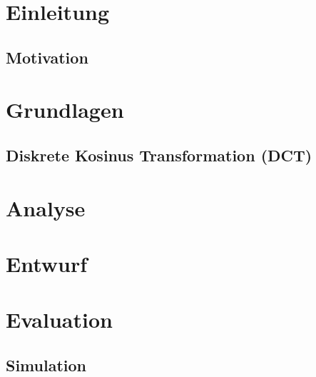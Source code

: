 



 

 \tableofcontents
 

 \printglossary[title={Abkürzungsverzeichnis}] 
 
 \chapter{Einleitung}
 \section{Motivation}
 
 
 
 \chapter{Grundlagen}
 
 
  
 \section{Diskrete Kosinus Transformation (DCT)}
 
 
 
 
 
 \chapter{Analyse}
 
 
 
 
 
 

 
 
 
 \chapter{Entwurf}
  
 
 
 
  
 \chapter{Evaluation}
 \section{Simulation}
